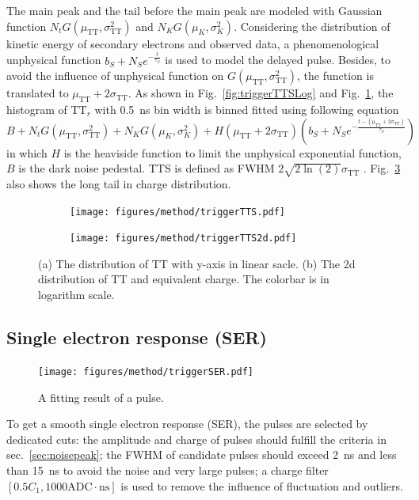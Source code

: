 The main peak and the tail before the main peak are modeled with Gaussian function $N_tG(\mu_{\mathrm{TT}},\sigma_{\mathrm{TT}}^2)$ and $N_KG(\mu_K,\sigma_K^2)$. Considering the distribution of kinetic energy of secondary electrons \cite{Furman,SecondElectron} and observed data, a phenomenological unphysical function $b_S+N_Se^{-\frac{t}{\tau_S}}$ is used to model the delayed pulse. Besides, to avoid the influence of unphysical function on $G(\mu_{\mathrm{TT}},\sigma_{\mathrm{TT}}^2)$, the function is translated to $\mu_{\mathrm{TT}}+2\sigma_{\mathrm{TT}}$.  As shown in Fig.~\ref{fig:triggerTTSLog} and Fig.~\ref{fig:triggerTTS}, the histogram of $\mathrm{TT}_r$ with \SI{0.5}{ns} bin width is binned fitted using following equation
\begin{equation}
    B+N_tG(\mu_{\mathrm{TT}},\sigma_{\mathrm{TT}}^2)+N_KG(\mu_K,\sigma_K^2)+H(\mu_{\mathrm{TT}}+2\sigma_{\mathrm{TT}})\left(b_S+N_Se^{-\frac{t-(\mu_{\mathrm{TT}}+2\sigma_{\mathrm{TT}})}{\tau_S}}\right)
\end{equation}
in which $H$ is the heaviside function to limit the unphysical exponential function, $B$ is the dark noise pedestal. TTS is defined as FWHM $2\sqrt{2\ln(2)}\sigma_{\mathrm{TT}}$ \cite{HAMAMATSUManual}. Fig.~\ref{fig:triggerTTS2d} also shows the long tail in charge distribution.

\begin{figure}[!htbp]
    \centering
    \begin{subfigure}[t]{\SF\textwidth}
        \texttt{[image: figures/method/triggerTTS.pdf]}
        \caption{}%
        \label{fig:triggerTTS}
    \end{subfigure}
    \begin{subfigure}[t]{\SF\textwidth}
        \texttt{[image: figures/method/triggerTTS2d.pdf]}
        \caption{}%
        \label{fig:triggerTTS2d}
    \end{subfigure}
    \caption{(a) The distribution of TT with y-axis in linear sacle. (b) The 2d distribution of TT and equivalent charge. The colorbar is in logarithm scale.}
\end{figure}

\subsection{Single electron response (SER)}
\begin{figure}
    \centering
    \texttt{[image: figures/method/triggerSER.pdf]}
    \caption{A fitting result of a pulse.}
    \label{fig:triggerser}
\end{figure}
To get a smooth single electron response (SER), the pulses are selected by dedicated cuts: the amplitude and charge of pulses should fulfill the criteria in sec.~\ref{sec:noisepeak}; the FWHM of candidate pulses should exceed \SI{2}{ns} and less than \SI{15}{ns} to avoid the noise and very large pulses; a charge filter $[0.5C_1, 1000\mathrm{ADC\cdot ns}]$ is used to remove the influence of fluctuation and outliers.

